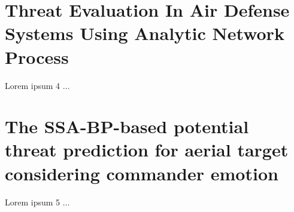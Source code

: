 \documentclass[12pt]{article} %
\begin{document}
\section*{Threat Evaluation In Air Defense Systems Using Analytic Network Process \cite{Unver2019ThreatEI}}
Lorem ipsum 4 $\ldots$

\section*{The SSA-BP-based potential threat prediction for aerial target considering commander emotion \\ \cite{WANG20222097}}
Lorem ipsum 5 $\ldots$

\newpage
\begin{center}


\end{center}
\end{document}
